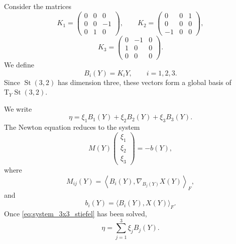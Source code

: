 \documentclass[11pt]{article}
\newcommand{\T}{\mathrm{T}}
\begin{document}
Consider the matrices
\[
    K_1=
    \begin{pmatrix}
        0&0&0\\
        0&0&-1\\
        0&1&0
    \end{pmatrix},
    \qquad
    K_2=
    \begin{pmatrix}
        0&0&1\\
        0&0&0\\
        -1&0&0
    \end{pmatrix},
\]
\[
    K_3=
    \begin{pmatrix}
        0&-1&0\\
        1&0&0\\
        0&0&0
    \end{pmatrix}.
\]
We define
\begin{equation}\label{eq:tangent_basis_stiefel}
    B_i(Y)=K_iY,
    \qquad
    i=1,2,3.
\end{equation}
Since $\operatorname{St}(3,2)$ has dimension three, these vectors form
a global basis of $\T_Y\operatorname{St}(3,2)$.

We write
\[
    \eta
    =
    \xi_1B_1(Y)
    +
    \xi_2B_2(Y)
    +
    \xi_3B_3(Y).
\]
The Newton equation reduces to the system
\begin{equation}\label{eq:system_3x3_stiefel}
    M(Y)
    \begin{pmatrix}
        \xi_1\\
        \xi_2\\
        \xi_3
    \end{pmatrix}
    =
    -b(Y),
\end{equation}
where
\[
    M_{ij}(Y)
    =
    \left\langle
        B_i(Y),
        \nabla_{B_j(Y)}X(Y)
    \right\rangle_F,
\]
and
\[
    b_i(Y)
    =
    \langle B_i(Y),X(Y)\rangle_F.
\]
Once \eqref{eq:system_3x3_stiefel} has been solved,
\[
    \eta
    =
    \sum_{j=1}^3\xi_jB_j(Y).
\]

\end{document}
